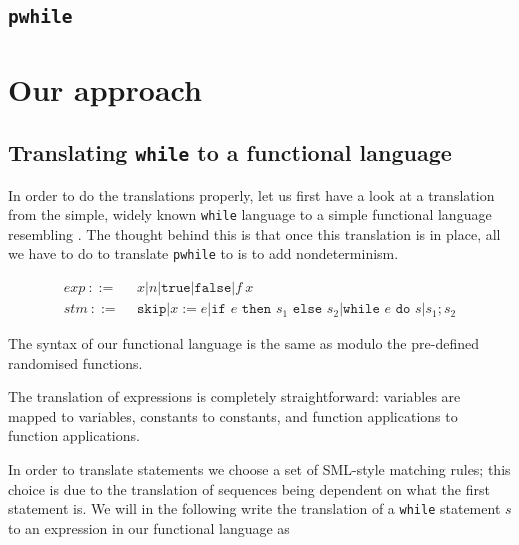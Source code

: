 \documentclass[11pt, leqno]{article}
\begin{document}
\subsection{\texttt{pwhile}}


\section{Our approach}





\subsection{Translating \texttt{while} to a functional language}
In order to do the translations properly, let us first have a look at a translation
from the simple, widely known \texttt{while} language to a simple functional language
resembling \rml. The thought behind this is that once this translation is in place,
all we have to do to translate \texttt{pwhile} to \rml is to add nondeterminism.

\begin{align}
  \label{eq:while}
  exp~  ::=~~ & x \vert n \vert \texttt{true} \vert \texttt{false} \vert f~x \\
  stm~  ::=~~ & \texttt{skip} \vert x := e
               \vert \texttt{if } e \texttt{ then } s_1 \texttt{ else } s_2
               \vert \texttt{while } e \texttt{ do } s \vert s_1;s_2
\end{align}

The syntax of our functional language is the same as \rml modulo the pre-defined
randomised functions.

The translation of expressions is completely straightforward: variables are mapped to
variables, constants to constants, and function applications to function applications. 

In order to translate statements we choose a set of SML-style matching rules; this
choice is due to the translation of sequences being dependent on what the first
statement is. We will in the following write the translation of a \texttt{while}
statement $s$ to an expression in our functional language as 
\end{document}

